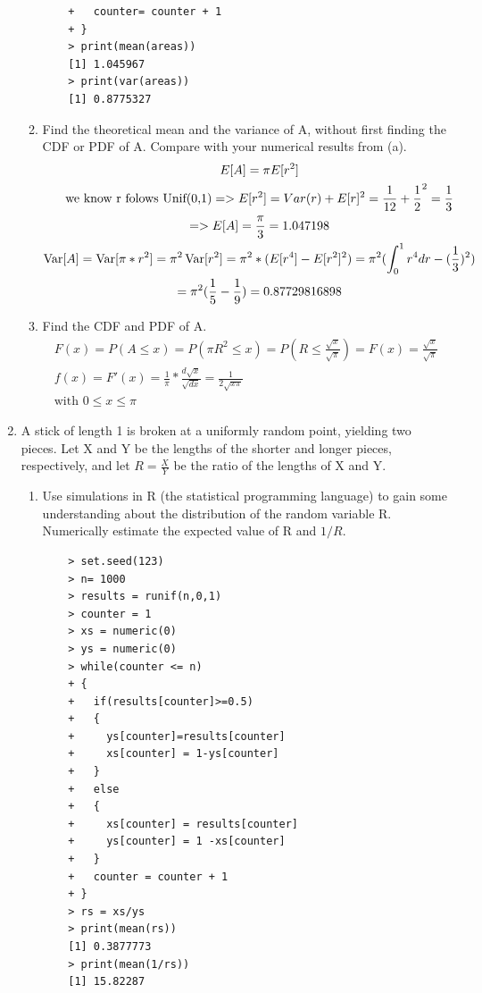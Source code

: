 \documentclass[11pt]{article}
\newcommand{\var}{\mathop{\rm Var}}
\begin{document}
\begin{enumerate}
\begin{enumerate}
\begin{verbatim}
	+   counter= counter + 1
	+ }
	> print(mean(areas))
	[1] 1.045967
	> print(var(areas))
	[1] 0.8775327
	\end{verbatim}
	\item Find the theoretical mean and the variance of A, without first finding the CDF or PDF of A. Compare
	with your numerical results from (a).
	\begin{gather}
	E[A] = \pi E[r^2]\\
	\text{we know r folows Unif(0,1)} => E[r^2] = Var(r) + E[r]^2 = \frac{1}{12} + \frac{1}{2}^2 = \frac{1}{3}\\
	=> E[A] = \frac{\pi}{3} = 1.047198\\
	\var[A] = \var[\pi * r^2] = \pi^2\var[r^2] = \pi^2 * (E[r^4]-E[r^2]^2) = 
	\pi^2 (\int_{0}^{1}r^4 dr -(\frac{1}{3})^2) \\
	= \pi^2 (\frac{1}{5} -\frac{1}{9}) = 0.87729816898 
	\end{gather}
	\item Find the CDF and PDF of A.
	\begin{gather}
	F(x) = P(A \le x) = P(\pi R^2 \le x) = P(R \le \frac{\sqrt{x}}{\sqrt{\pi}})= F(x) = \frac{\sqrt{x}}{\sqrt{\pi}}\\
	f(x) = F'(x) = \frac{1}{\pi} * \frac{d\sqrt{x}}{\sqrt{dx}} = \frac{1}{2\sqrt{x \pi}}
	\\
	\text{with } 0 \le x \le \pi
	\end{gather}
\end{enumerate}
\item A stick of length 1 is broken at a uniformly random point, yielding two pieces. Let X and Y be the lengths
of the shorter and longer pieces, respectively, and let $R = \frac{X}{Y}$ be the ratio of the lengths of X and Y.
\begin{enumerate}
	\item  Use simulations in R (the statistical programming language) to gain some understanding about the distribution of the random variable R. Numerically estimate the expected value of R and $1/R$.
	\begin{verbatim}
	> set.seed(123)
	> n= 1000
	> results = runif(n,0,1)
	> counter = 1
	> xs = numeric(0)
	> ys = numeric(0)
	> while(counter <= n)
	+ {
	+   if(results[counter]>=0.5)
	+   {
	+     ys[counter]=results[counter]
	+     xs[counter] = 1-ys[counter]
	+   }
	+   else
	+   {
	+     xs[counter] = results[counter]
	+     ys[counter] = 1 -xs[counter]
	+   }
	+   counter = counter + 1
	+ }
	> rs = xs/ys
	> print(mean(rs))
	[1] 0.3877773
	> print(mean(1/rs))
	[1] 15.82287

\end{verbatim}
\end{enumerate}
\end{enumerate}
\end{document}
